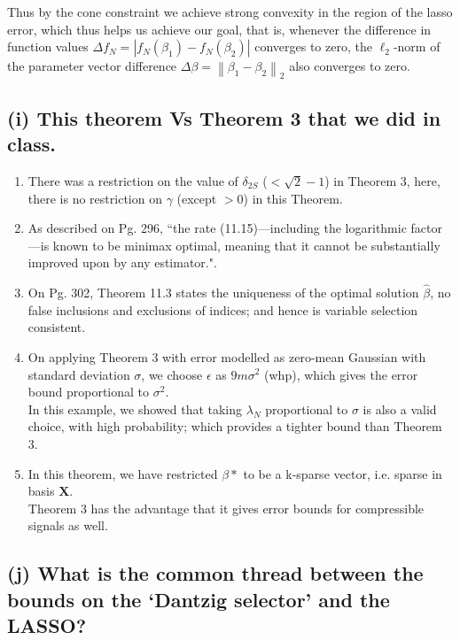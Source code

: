 \documentclass[fleqn, 11pt]{article}
\newcommand\norm[1]{\left\lVert#1\right\rVert}
\begin{document}
Thus by the cone constraint we achieve strong convexity in the region of the lasso error,
which thus helps us achieve our goal, that is,
whenever the difference in function values $\Delta f_N = | f_N(\beta_1) - f_N(\beta_2) |  $
converges to zero, the $\ell_2$-norm
of the parameter vector difference 
$\Delta \beta = \norm{ \beta_1 - \beta_2 }_2    $ also converges to zero. 

\bigskip


\newpage
\subsection*{(i)  This theorem Vs Theorem 3 that we did in class.}
\begin{enumerate}
    \item There was a restriction on the value of $\delta_{2S}$ ($< \sqrt{2} - 1$) in Theorem 3, here, there is no restriction on $\gamma$ (except $> 0$) in this Theorem.
    \item As described on Pg. 296, ``the rate (11.15)—including the logarithmic factor—is known to be minimax optimal, meaning that it cannot be substantially improved upon by any estimator.".
    \item On Pg. 302, Theorem 11.3 states the uniqueness of the optimal solution $\hat{\beta}$, no false inclusions and exclusions of indices; and hence is variable selection consistent.
    \item On applying Theorem 3 with error modelled as zero-mean Gaussian with standard deviation $\sigma$, we choose $\epsilon$ as $9m\sigma^2$ (whp), which gives the error bound proportional to $\sigma^2$.\\
    In this example, we showed that taking $\lambda_N$ proportional to $\sigma$ is also a valid choice, with high probability; which provides a tighter bound than Theorem 3.
    \item In this theorem, we have restricted $\beta*$ to be a k-sparse vector, i.e. sparse in basis $\mathbf{X}$. \\
    Theorem 3 has the advantage that it gives error bounds for compressible signals as well.
\end{enumerate}

\bigskip


\subsection*{(j) What is the common thread between the bounds on the `Dantzig selector' and the LASSO?}
\end{document}
